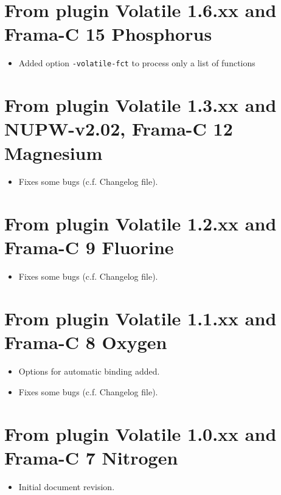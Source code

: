 \section*{From plugin Volatile 1.6.xx and Frama-C 15 Phosphorus}
\begin{itemize}
\item Added option \texttt{-volatile-fct} to process only a list of functions
\end{itemize}

\section*{From plugin Volatile 1.3.xx and NUPW-v2.02, Frama-C 12 Magnesium}
\begin{itemize}
\item Fixes some bugs (c.f. Changelog file).
\end{itemize}

\section*{From plugin Volatile 1.2.xx and Frama-C 9 Fluorine}
\begin{itemize}
\item Fixes some bugs (c.f. Changelog file).
\end{itemize}

\section*{From plugin Volatile 1.1.xx and Frama-C 8 Oxygen}
\begin{itemize}
\item Options for automatic binding added.
\item Fixes some bugs (c.f. Changelog file).
\end{itemize}

\section*{From plugin Volatile 1.0.xx and Frama-C 7 Nitrogen}
\begin{itemize}
\item Initial document revision.
\end{itemize}
